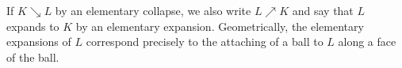 If $K \searrow L$ by an elementary collapse, we also write $L \nearrow K$ and say that $L$ expands to $K$ by an elementary expansion. Geometrically, the elementary expansions of $L$ correspond precisely to the attaching of a ball to $L$ along a face of the ball.

